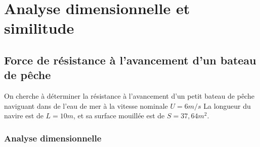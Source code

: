 

\section{Analyse dimensionnelle et similitude}

\subsection{Force de résistance à l'avancement d'un bateau de pêche}


On cherche à déterminer la résistance à l'avancement d'un petit bateau de pêche naviguant dans de l'eau de mer à la vitesse nominale $U = 6 m/s$
La longueur du navire est de $L = 10 m$, et sa surface mouillée est de $S = 37,64 m^2$. 


\subsubsection{Analyse dimensionnelle}

